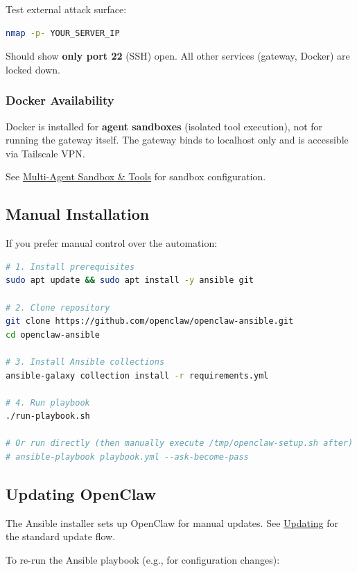 Test external attack surface:

\begin{lstlisting}[language=bash]
nmap -p- YOUR_SERVER_IP
\end{lstlisting}


Should show \textbf{only port 22} (SSH) open. All other services (gateway, Docker) are locked down.

\subsubsection{Docker Availability}


Docker is installed for \textbf{agent sandboxes} (isolated tool execution), not for running the gateway itself. The gateway binds to localhost only and is accessible via Tailscale VPN.

See \href{/tools/multi-agent-sandbox-tools}{Multi-Agent Sandbox \& Tools} for sandbox configuration.

\subsection{Manual Installation}


If you prefer manual control over the automation:

\begin{lstlisting}[language=bash]
# 1. Install prerequisites
sudo apt update && sudo apt install -y ansible git

# 2. Clone repository
git clone https://github.com/openclaw/openclaw-ansible.git
cd openclaw-ansible

# 3. Install Ansible collections
ansible-galaxy collection install -r requirements.yml

# 4. Run playbook
./run-playbook.sh

# Or run directly (then manually execute /tmp/openclaw-setup.sh after)
# ansible-playbook playbook.yml --ask-become-pass
\end{lstlisting}


\subsection{Updating OpenClaw}


The Ansible installer sets up OpenClaw for manual updates. See \href{/install/updating}{Updating} for the standard update flow.

To re-run the Ansible playbook (e.g., for configuration changes):

